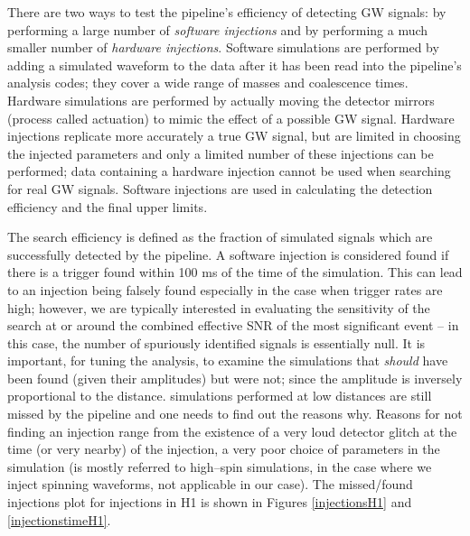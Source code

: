There are two ways to test the pipeline's efficiency of detecting GW signals: by performing a large number of \emph{software injections} and by performing a much smaller number of \emph{hardware injections}. Software simulations are performed by adding a simulated waveform to the data after it has been read into the pipeline’s analysis codes; they cover a wide range of masses and coalescence times. Hardware simulations are performed by actually moving the detector mirrors (process called actuation) to mimic the effect of a possible GW signal. Hardware injections replicate more accurately a true GW signal, but are limited in choosing the injected parameters and only a limited number of these injections can be performed; data containing a hardware injection cannot be used when searching for real GW signals. Software injections are used in calculating the detection efficiency and the final upper limits. 

The search efficiency is defined as the fraction of simulated signals which are successfully detected by the pipeline. A software injection is considered found if there is a trigger found within 100 ms of the time of the simulation. This can lead to an injection being falsely found especially in the case when trigger rates are high; however, we are typically interested in evaluating the sensitivity of the search at or around the combined effective SNR of the most significant event -- in this case, the number of spuriously identified signals is essentially null. It is important, for tuning the analysis, to examine the simulations that \emph{should} have been found (given their amplitudes) but were not; since the amplitude is inversely proportional to the distance. simulations performed at low distances are still missed by the pipeline and one needs to find out the reasons why. Reasons for not finding an injection range from the existence of a very loud detector glitch at the time (or very nearby) of the injection, a very poor choice of parameters in the simulation (is mostly referred to high--spin simulations, in the case where we inject spinning waveforms, not applicable in our case). The missed/found injections plot for injections in H1 is shown in Figures \ref{injectionsH1} and \ref{injectionstimeH1}.

